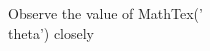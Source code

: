\documentclass[preview]{standalone}
\begin{document}
\begin{center}
Observe the value of MathTex('\\theta') closely
\end{center}
\end{document}
